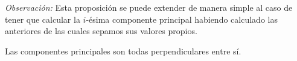 \noindent \emph{Observación: } Esta proposición se puede extender de manera simple al caso de tener que calcular la $i$-ésima componente principal habiendo calculado las anteriores de las cuales sepamos sus valores propios. 

\begin{coro}
Las componentes principales son todas perpendiculares entre sí. 
\end{coro}


